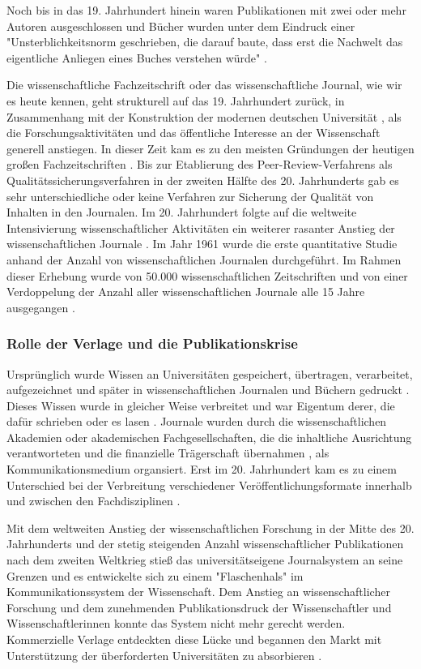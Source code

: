 Noch bis in das 19. Jahrhundert hinein waren Publikationen mit zwei oder mehr Autoren ausgeschlossen und Bücher wurden unter dem Eindruck einer "Unsterblichkeitsnorm geschrieben, die darauf baute, dass erst die Nachwelt das eigentliche Anliegen eines Buches verstehen würde" \cite[:28]{Hagner_2015}.

Die wissenschaftliche Fachzeitschrift oder das wissenschaftliche Journal, wie wir es heute kennen, geht strukturell auf das 19. Jahrhundert zurück, in Zusammenhang mit der Konstruktion der modernen deutschen Universität \cite{Paletschek_2002}, als die Forschungsaktivitäten und das öffentliche Interesse an der Wissenschaft generell anstiegen. In dieser Zeit kam es zu den meisten Gründungen der heutigen großen Fachzeitschriften \cite[:212]{Porter_1964}. Bis zur Etablierung des Peer-Review-Verfahrens als Qualitätssicherungsverfahren in der zweiten Hälfte des 20. Jahrhunderts gab es sehr unterschiedliche oder keine Verfahren zur Sicherung der Qualität von Inhalten in den Journalen. Im 20. Jahrhundert folgte auf die weltweite Intensivierung wissenschaftlicher Aktivitäten ein weiterer rasanter Anstieg der wissenschaftlichen Journale \cite[:23]{Haustein_2012}. Im Jahr 1961 wurde die erste quantitative Studie anhand der Anzahl von wissenschaftlichen Journalen durchgeführt. Im Rahmen dieser Erhebung wurde von 50.000 wissenschaftlichen Zeitschriften und von einer Verdoppelung der Anzahl aller wissenschaftlichen Journale alle 15 Jahre ausgegangen \cite{de_Solla_Price_1982}.

\subsubsection{Rolle der Verlage und die Publikationskrise}

Ursprünglich wurde Wissen an Universitäten gespeichert, übertragen, verarbeitet, aufgezeichnet und später in wissenschaftlichen Journalen und Büchern gedruckt \cite{Kittler_2004}. Dieses Wissen wurde in gleicher Weise verbreitet und war Eigentum derer, die dafür schrieben oder es lasen \cite{Weiner_2001}. Journale wurden durch die wissenschaftlichen Akademien oder akademischen Fachgesellschaften, die die inhaltliche Ausrichtung verantworteten und die finanzielle Trägerschaft übernahmen \cite{Weiner_2001}, als Kommunikationsmedium organsiert. Erst im 20. Jahrhundert kam es zu einem Unterschied bei der Verbreitung verschiedener Veröffentlichungsformate innerhalb und zwischen den Fachdisziplinen \cite{Hagner_2015}.

Mit dem weltweiten Anstieg der wissenschaftlichen Forschung in der Mitte des 20. Jahrhunderts und der stetig steigenden Anzahl wissenschaftlicher Publikationen nach dem zweiten Weltkrieg stieß das universitätseigene Journalsystem an seine Grenzen und es entwickelte sich zu einem "Flaschenhals" \cite{Weiner_2001} im Kommunikationssystem der Wissenschaft. Dem Anstieg an wissenschaftlicher Forschung und dem zunehmenden Publikationsdruck der Wissenschaftler und Wissenschaftlerinnen konnte das System nicht mehr gerecht werden. Kommerzielle Verlage entdeckten diese Lücke und begannen den Markt mit Unterstützung der überforderten Universitäten zu absorbieren \cite{Hirschi_2015}.

